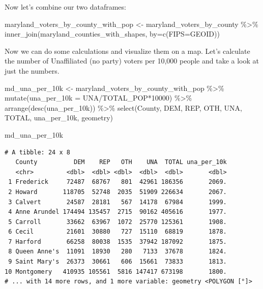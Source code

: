 \documentclass[
  letterpaper,
  DIV=11,
  numbers=noendperiod]{scrreprt}
\newenvironment{Shaded}{\begin{snugshade}}{\end{snugshade}}
\newcommand{\AttributeTok}[1]{\textcolor[rgb]{0.40,0.45,0.13}{#1}}
\newcommand{\DecValTok}[1]{\textcolor[rgb]{0.68,0.00,0.00}{#1}}
\newcommand{\FunctionTok}[1]{\textcolor[rgb]{0.28,0.35,0.67}{#1}}
\newcommand{\NormalTok}[1]{\textcolor[rgb]{0.00,0.23,0.31}{#1}}
\newcommand{\OtherTok}[1]{\textcolor[rgb]{0.00,0.23,0.31}{#1}}
\newcommand{\SpecialCharTok}[1]{\textcolor[rgb]{0.37,0.37,0.37}{#1}}
\newcommand{\StringTok}[1]{\textcolor[rgb]{0.13,0.47,0.30}{#1}}
\begin{document}
Now let's combine our two dataframes:

\begin{Shaded}
\begin{Highlighting}[]
\NormalTok{maryland\_voters\_by\_county\_with\_pop }\OtherTok{\textless{}{-}}\NormalTok{ maryland\_voters\_by\_county }\SpecialCharTok{\%\textgreater{}\%} \FunctionTok{inner\_join}\NormalTok{(maryland\_counties\_with\_shapes, }\AttributeTok{by=}\FunctionTok{c}\NormalTok{(}\StringTok{\textquotesingle{}FIPS\textquotesingle{}}\OtherTok{=}\StringTok{\textquotesingle{}GEOID\textquotesingle{}}\NormalTok{))}
\end{Highlighting}
\end{Shaded}

Now we can do some calculations and visualize them on a map. Let's
calculate the number of Unaffiliated (no party) voters per 10,000 people
and take a look at just the numbers.

\begin{Shaded}
\begin{Highlighting}[]
\NormalTok{md\_una\_per\_10k }\OtherTok{\textless{}{-}}\NormalTok{ maryland\_voters\_by\_county\_with\_pop }\SpecialCharTok{\%\textgreater{}\%}
  \FunctionTok{mutate}\NormalTok{(}\AttributeTok{una\_per\_10k =}\NormalTok{ UNA}\SpecialCharTok{/}\NormalTok{TOTAL\_POP}\SpecialCharTok{*}\DecValTok{10000}\NormalTok{) }\SpecialCharTok{\%\textgreater{}\%}
  \FunctionTok{arrange}\NormalTok{(}\FunctionTok{desc}\NormalTok{(una\_per\_10k)) }\SpecialCharTok{\%\textgreater{}\%} 
  \FunctionTok{select}\NormalTok{(County, DEM, REP, OTH, UNA, TOTAL, una\_per\_10k, geometry)}

\NormalTok{md\_una\_per\_10k}
\end{Highlighting}
\end{Shaded}

\begin{verbatim}
# A tibble: 24 x 8
   County          DEM    REP   OTH    UNA  TOTAL una_per_10k
   <chr>         <dbl>  <dbl> <dbl>  <dbl>  <dbl>       <dbl>
 1 Frederick     72487  68767   801  42961 186356       2069.
 2 Howard       118705  52748  2035  51909 226634       2067.
 3 Calvert       24587  28181   567  14178  67984       1999.
 4 Anne Arundel 174494 135457  2715  90162 405616       1977.
 5 Carroll       33662  63967  1072  25770 125361       1908.
 6 Cecil         21601  30880   727  15110  68819       1878.
 7 Harford       66258  80038  1535  37942 187092       1875.
 8 Queen Anne's  11091  18930   280   7133  37678       1824.
 9 Saint Mary's  26373  30661   606  15661  73833       1813.
10 Montgomery   410935 105561  5816 147417 673198       1800.
# ... with 14 more rows, and 1 more variable: geometry <POLYGON [°]>
\end{verbatim}
\end{document}
